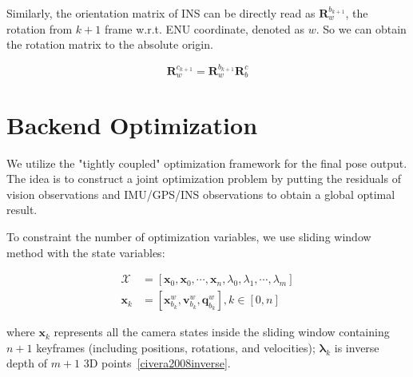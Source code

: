 \documentclass[12pt]{report}   %
\begin{document}
Similarly, the orientation matrix of INS can be directly read as $\bm{R}_{w}^{b_{k+1}}$, the rotation from $k+1$ frame w.r.t. ENU coordinate, denoted as $w$. So we can obtain the rotation matrix to the absolute origin.

\begin{equation}
\bm{R}_{w}^{c_{k+1}} = \bm{R}_{w}^{b_{k+1}}\bm{R}_b^c
\end{equation}





\chapter{Backend Optimization}

We utilize the "tightly coupled" optimization framework for the final pose output. The idea is to construct a joint optimization problem by putting the residuals of vision observations and IMU/GPS/INS observations to obtain a global optimal result.

To constraint the number of optimization variables, we use sliding window method with the state variables:


\begin{equation}
\begin{aligned}
\mathbf{\mathcal{X}} &= \left[  \mathbf{x}_0, \mathbf{x}_0, \cdots, \mathbf{x}_n, \lambda_0, \lambda_1, \cdots, \lambda_m  \right] \\
\mathbf{x}_k &= \left[  \mathbf{x}_{b_k}^w, \mathbf{v}_{b_k}^w, \mathbf{q}_{b_k}^w  \right], k\in{[0, n]} 
\end{aligned} \label{states}
\end{equation}

where $\mathbf{x}_k$ represents all the camera states inside the sliding window containing $n+1$ keyframes (including positions, rotations, and velocities); $\mathbf{\lambda}_k$ is inverse depth of $m+1$ 3D points~\ref{civera2008inverse}.
\end{document}
